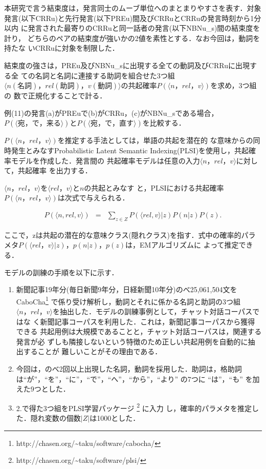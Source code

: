 本研究で言う結束度は，発言同士のムーブ単位へのまとまりやすさを表す．対象
発言(以下CRRu)と先行発言(以下PREu)間及びCRRuとCRRuの発言時刻から1分以内
に発言された最寄りのCRRuと同一話者の発言(以下NBNu\_s)間の結束度を計り，
どちらのペアの結束度が強いかの2値を素性とする．なお今回は，動詞を持たな
いCRRuに対象を制限した．

結束度の強さは，PREu及びNBNu\_sに出現する全ての動詞及びCRRuに出現する全
ての名詞と名詞に連接する助詞を組合せた3つ組$\langle n (名詞)，rel (助詞)，
v(動詞) \rangle$の共起確率$P(\langle n，rel，v \rangle)$を求め，3つ組の
数で正規化することで計る．

例(11)の発言(a)がPREuで(b)がCRRu，(c)がNBNu\_sである場合，$P(\langle 宛，
で，来る \rangle)$と$P(\langle 宛，で，直す \rangle)$を比較する．


$P(\langle n，rel，v \rangle)$を推定する手法としては，単語の共起を潜在的
な意味からの同時発生とみなすProbabilistic Latent Semantic 
Indexing(PLSI)\cite{th:plsi}を使用し，共起確率モデルを作成した．発言間の
共起確率モデルは任意の入力$\langle n，rel，v \rangle$に対して，共起確率
を出力する． 

$\langle n，rel，v \rangle$を$\langle rel，v \rangle$と$n$の共起とみなす
と，PLSIにおける共起確率$P(\langle n，rel，v \rangle)$は次式で与えられる． 

\begin{eqnarray*}
  P(\langle n,rel,v \rangle) &= &\sum_{z\in Z}P(\langle rel,v
  \rangle|z)P(n|z)P(z).
\end{eqnarray*}

ここで，zは共起の潜在的な意味クラス(隠れクラス)を指す．式中の確率的パラ
メタ$P(\langle rel，v \rangle|z)$，$p(n|z)$，$p(z)$は，EMアルゴリズムに
よって推定できる\cite{th:plsi}． 

モデルの訓練の手順を以下に示す． 
\begin{enumerate}
\item 新聞記事19年分(毎日新聞9年分，日経新聞10年分)のべ25,061,504文を
CaboCha\footnote{http://chasen.org/\~{}taku/software/cabocha/} 
で係り受け解析し，動詞とそれに係かる名詞と助詞の3つ組$\langle n，rel，v
\rangle$を抽出した．モデルの訓練事例として，チャット対話コーパスではな
く新聞記事コーパスを利用した．これは，新聞記事コーパスから獲得できる
共起用例は大規模であることと，チャット対話コーパスは，関連する発言が必
ずしも隣接しないという特徴のため正しい共起用例を自動的に抽出することが
難しいことがその理由である．
\item 今回は，のべ2回以上出現した名詞，動詞を採用した．助詞は，格助詞
 は``が''，``を''，``に''，``で''，``へ''，``から''，``より'' の7つに
 ``は''，``も'' を加えた9つとした． 
\item 2.で得た3つ組をPLSI学習パッケージ
\footnote{http://chasen.org/\~{}taku/software/plsi/} に入力
し，確率的パラメタを推定した．隠れ変数の個数$|Z|$は1000とした． 
\end{enumerate}

